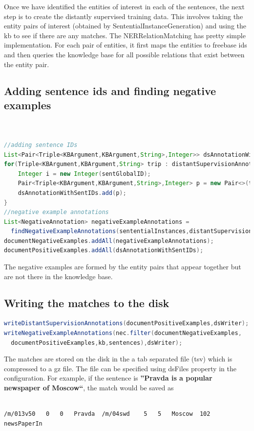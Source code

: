 \documentclass[a4paper,10pt]{report}
\begin{document}
Once we have identified the entities of interest in each of the sentences, the next step is to create the distantly supervised training data. 
This involves taking the entity pairs of interest (obtained by SententialInstanceGeneration) and using the kb to see if there are any matches. 
The NERRelationMatching has pretty simple implementation. For each pair of entities, it first maps the entities to freebase ids and then queries the knowledge
base for all possible relations that exist between the entity pair.



\subsection{Adding sentence ids and finding negative examples}
\begin{lstlisting}[language=java]


//adding sentence IDs
List<Pair<Triple<KBArgument,KBArgument,String>,Integer>> dsAnnotationWithSentIDs = new ArrayList<>();
for(Triple<KBArgument,KBArgument,String> trip : distantSupervisionAnnotations){
	Integer i = new Integer(sentGlobalID);
	Pair<Triple<KBArgument,KBArgument,String>,Integer> p = new Pair<>(trip,i);
	dsAnnotationWithSentIDs.add(p);
}
//negative example annotations
List<NegativeAnnotation> negativeExampleAnnotations =
  findNegativeExampleAnnotations(sententialInstances,distantSupervisionAnnotations,kb,sentGlobalID);
documentNegativeExamples.addAll(negativeExampleAnnotations);
documentPositiveExamples.addAll(dsAnnotationWithSentIDs);				
\end{lstlisting}
The negative examples are formed by the entity pairs that appear together but are not there in the knowledge base.

\subsection{Writing the matches to the disk}
\begin{lstlisting}[language=java]
writeDistantSupervisionAnnotations(documentPositiveExamples,dsWriter);
writeNegativeExampleAnnotations(nec.filter(documentNegativeExamples,
  documentPositiveExamples,kb,sentences),dsWriter);
\end{lstlisting}

The matches are stored on the disk in the a tab separated file (tsv) which is compressed to a gz file. The file can be specified using 
dsFiles property in the configuration. For example, if the sentence is \textbf{''Pravda is a popular newspaper of Moscow``}, the match would be saved
as 
\begin{verbatim}
 
/m/013v50	0	0	Pravda	/m/04swd	5	5	Moscow	102	newsPaperIn

\end{verbatim}
\end{document}
